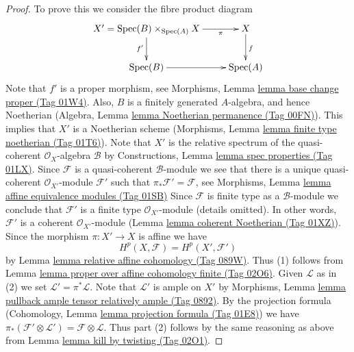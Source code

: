 \documentclass{amsart}
\theoremstyle{plain}
\theoremstyle{definition}
\theoremstyle{remark}
\numberwithin{equation}{subsection}
\def\Spec{\mathop{\mathrm{Spec}}}
\begin{document}
\begin{proof}
To prove this we consider the fibre product diagram
$$
\xymatrix{
X' = \Spec(B) \times_{\Spec(A)} X
\ar[r]_-\pi \ar[d]_{f'} &
X \ar[d]^f \\
\Spec(B) \ar[r] &
\Spec(A)
}
$$
Note that $f'$ is a proper morphism, see
Morphisms, Lemma \href{https://stacks.math.columbia.edu/tag/01W4}{lemma base change proper (Tag 01W4)}.
Also, $B$ is a finitely generated $A$-algebra, and hence
Noetherian (Algebra, Lemma \href{https://stacks.math.columbia.edu/tag/00FN}{lemma Noetherian permanence (Tag 00FN)}).
This implies that $X'$ is a Noetherian scheme
(Morphisms, Lemma \href{https://stacks.math.columbia.edu/tag/01T6}{lemma finite type noetherian (Tag 01T6)}).
Note that $X'$ is the relative spectrum of the quasi-coherent
$\mathcal{O}_X$-algebra $\mathcal{B}$ by
Constructions, Lemma \href{https://stacks.math.columbia.edu/tag/01LX}{lemma spec properties (Tag 01LX)}.
Since $\mathcal{F}$ is a quasi-coherent $\mathcal{B}$-module
we see that there is a unique quasi-coherent
$\mathcal{O}_{X'}$-module $\mathcal{F}'$ such that
$\pi_*\mathcal{F}' = \mathcal{F}$, see
Morphisms, Lemma \href{https://stacks.math.columbia.edu/tag/01SB}{lemma affine equivalence modules (Tag 01SB)}
Since $\mathcal{F}$ is finite type as a $\mathcal{B}$-module we
conclude that $\mathcal{F}'$ is a finite type
$\mathcal{O}_{X'}$-module (details omitted). In other words,
$\mathcal{F}'$ is a coherent $\mathcal{O}_{X'}$-module
(Lemma \href{https://stacks.math.columbia.edu/tag/01XZ}{lemma coherent Noetherian (Tag 01XZ)}).
Since the morphism $\pi : X' \to X$ is affine we have
$$
H^p(X, \mathcal{F}) = H^p(X', \mathcal{F}')
$$
by Lemma \href{https://stacks.math.columbia.edu/tag/089W}{lemma relative affine cohomology (Tag 089W)}.
Thus (1) follows from
Lemma \href{https://stacks.math.columbia.edu/tag/02O6}{lemma proper over affine cohomology finite (Tag 02O6)}.
Given $\mathcal{L}$ as in (2) we set
$\mathcal{L}' = \pi^*\mathcal{L}$. Note that $\mathcal{L}'$ is
ample on $X'$ by
Morphisms, Lemma \href{https://stacks.math.columbia.edu/tag/0892}{lemma pullback ample tensor relatively ample (Tag 0892)}.
By the projection formula
(Cohomology, Lemma \href{https://stacks.math.columbia.edu/tag/01E8}{lemma projection formula (Tag 01E8)}) we have
$\pi_*(\mathcal{F}' \otimes \mathcal{L}') = \mathcal{F} \otimes \mathcal{L}$.
Thus part (2) follows by the same reasoning as above from
Lemma \href{https://stacks.math.columbia.edu/tag/02O1}{lemma kill by twisting (Tag 02O1)}.
\end{proof}
\end{document}
